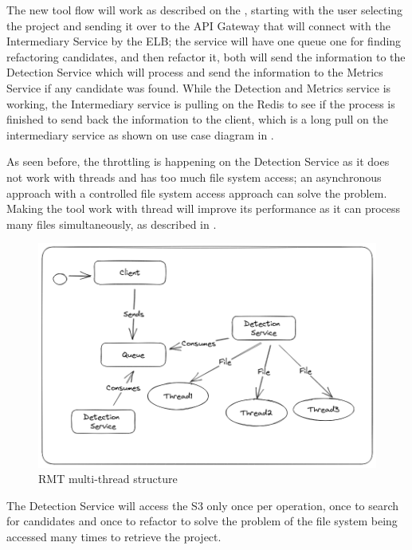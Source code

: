 The new tool flow will work as described on the , starting with the user selecting the project and sending it over to the API Gateway that will connect with the Intermediary Service by the ELB; the service will have one queue one for finding refactoring candidates, and then refactor it, both will send the information to the Detection Service which will process and send the information to the Metrics Service if any candidate was found. While the Detection and Metrics service is working, the Intermediary service is pulling on the Redis to see if the process is finished to send back the information to the client, which is a long pull on the intermediary service as shown on use case diagram in .


As seen before, the throttling is happening on the Detection Service as it does not work with threads and has too much file system access; an asynchronous approach with a controlled file system access approach can solve the problem. Making the tool work with thread will improve its performance as it can process many files simultaneously, as described in .

\begin{figure}[ht!]
\SetCaptionWidth{\textwidth}
\caption{RMT multi-thread structure}
\label{fig-threading}
\includegraphics[width =\textwidth, scale=0.2]{Chapter-5/Figures/threadDivision.png}
\end{figure}

The Detection Service will access the S3 only once per operation, once to search for candidates and once to refactor to solve the problem of the file system being accessed many times to retrieve the project.

